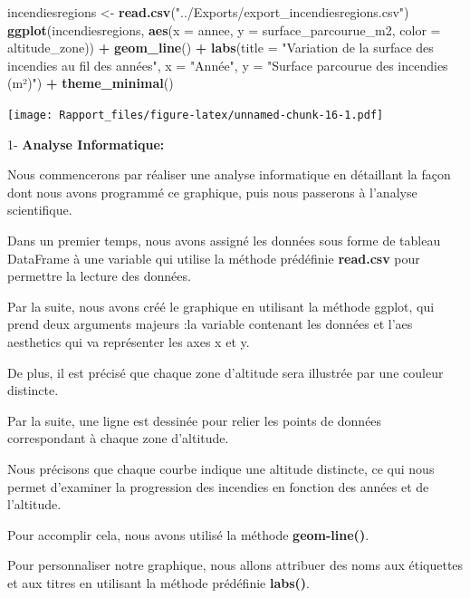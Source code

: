 \documentclass[
]{article}
\newenvironment{Shaded}{\begin{snugshade}}{\end{snugshade}}
\newcommand{\AttributeTok}[1]{\textcolor[rgb]{0.13,0.29,0.53}{#1}}
\newcommand{\FunctionTok}[1]{\textcolor[rgb]{0.13,0.29,0.53}{\textbf{#1}}}
\newcommand{\NormalTok}[1]{#1}
\newcommand{\OtherTok}[1]{\textcolor[rgb]{0.56,0.35,0.01}{#1}}
\newcommand{\SpecialCharTok}[1]{\textcolor[rgb]{0.81,0.36,0.00}{\textbf{#1}}}
\newcommand{\StringTok}[1]{\textcolor[rgb]{0.31,0.60,0.02}{#1}}
\begin{document}
\begin{Shaded}
\begin{Highlighting}[]
\NormalTok{incendiesregions }\OtherTok{\textless{}{-}} \FunctionTok{read.csv}\NormalTok{(}\StringTok{"../Exports/export\_incendiesregions.csv"}\NormalTok{)}
\FunctionTok{ggplot}\NormalTok{(incendiesregions, }\FunctionTok{aes}\NormalTok{(}\AttributeTok{x =}\NormalTok{ annee, }\AttributeTok{y =}\NormalTok{ surface\_parcourue\_m2, }\AttributeTok{color =}\NormalTok{ altitude\_zone)) }\SpecialCharTok{+}
  \FunctionTok{geom\_line}\NormalTok{() }\SpecialCharTok{+}
  \FunctionTok{labs}\NormalTok{(}\AttributeTok{title =} \StringTok{"Variation de la surface des incendies au fil des années"}\NormalTok{,}
       \AttributeTok{x =} \StringTok{"Année"}\NormalTok{, }\AttributeTok{y =} \StringTok{"Surface parcourue des incendies (m²)"}\NormalTok{) }\SpecialCharTok{+}
  \FunctionTok{theme\_minimal}\NormalTok{()}
\end{Highlighting}
\end{Shaded}

\texttt{[image: Rapport\_files/figure-latex/unnamed-chunk-16-1.pdf]}

1- \textbf{Analyse Informatique:}

Nous commencerons par réaliser une analyse informatique en détaillant la
façon dont nous avons programmé ce graphique, puis nous passerons à
l'analyse scientifique.

Dans un premier temps, nous avons assigné les données sous forme de
tableau DataFrame à une variable qui utilise la méthode prédéfinie
\textbf{read.csv} pour permettre la lecture des données.

Par la suite, nous avons créé le graphique en utilisant la méthode
ggplot, qui prend deux arguments majeurs :la variable contenant les
données et l'aes aesthetics qui va représenter les axes x et y.

De plus, il est précisé que chaque zone d'altitude sera illustrée par
une couleur distincte.

Par la suite, une ligne est dessinée pour relier les points de données
correspondant à chaque zone d'altitude.

Nous précisons que chaque courbe indique une altitude distincte, ce qui
nous permet d'examiner la progression des incendies en fonction des
années et de l'altitude.

Pour accomplir cela, nous avons utilisé la méthode \textbf{geom-line()}.

Pour personnaliser notre graphique, nous allons attribuer des noms aux
étiquettes et aux titres en utilisant la méthode prédéfinie
\textbf{labs()}.
\end{document}
